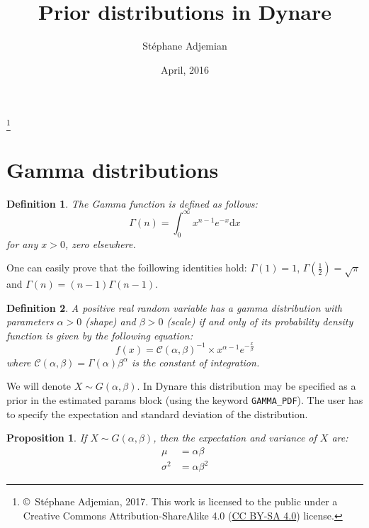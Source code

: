 \documentclass{amsart}
\theoremstyle{plain}
\newtheorem{proposition}{Proposition}[section]
\newtheorem{definition}{Definition}[section]
\theoremstyle{remark}
\numberwithin{equation}{section}
\begin{document}
\title{Prior distributions in Dynare}
\author{Stéphane Adjemian}
\thanks{\copyright\ Stéphane Adjemian, 2017. This work is licensed to the public under a Creative Commons Attribution-ShareAlike 4.0 (\href{https://creativecommons.org/licenses/by-sa/4.0/}{CC BY-SA 4.0}) license.}
\address{Université du Maine}
\date{April, 2016}

\maketitle

\section{Gamma distributions}\label{sec:GammaDistribution}

\begin{definition}
  The Gamma function is defined as follows:
  \[
    \Gamma(n) = \int_0^{\infty}x^{n-1}e^{-x}\mathrm d x
  \]
  for any $x>0$, zero elsewhere.
\end{definition}

One can easily prove that the foillowing identities hold:
$\Gamma(1) = 1$, $\Gamma\left(\frac{1}{2}\right)=\sqrt{\pi}$ and
$\Gamma(n)=(n-1)\Gamma(n-1)$.

\begin{definition}
  A positive real random variable has a gamma distribution with
  parameters $\alpha>0$ (shape) and $\beta>0$ (scale) if and only of
  its probability density function is given by the following equation:
  \[
    f(x)=\mathcal C(\alpha,\beta)^{-1} \times x^{\alpha-1}e^{-\frac{x}{\beta}}
  \]
  where $\mathcal C(\alpha, \beta) = \Gamma(\alpha)\beta^{\alpha}$ is the constant of
  integration.
\end{definition}
 We will denote $X\sim G(\alpha, \beta)$.  In Dynare this
 distribution may be specified as a prior in the estimated params
 block (using the keyword \verb+GAMMA_PDF+). The user has to specify the
 expectation and standard deviation of the distribution.

 \begin{proposition}
   \label{GammaDistributionMoments}
   If $X\sim G(\alpha, \beta)$, then the expectation and variance of $X$ are:
   \[
     \begin{split}
       \mu &= \alpha\beta \\
       \sigma^2 &= \alpha\beta^2
     \end{split}
   \]
 \end{proposition}
\end{document}
